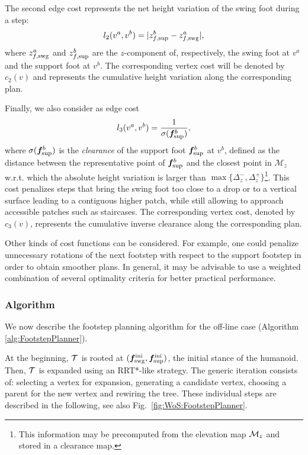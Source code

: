 The second edge cost represents the net height variation of the swing foot
during a step:
\begin{equation}
l_2(v^a, v^b) = |z^b_{f, {\rm sup}} - z^a_{f, {\rm swg}}|,
\label{eq:WoS:costHeight}
\end{equation}
where $z^a_{f, {\rm swg}}$ and $z^b_{f, {\rm sup}}$ are the $z$-component of,
respectively, the swing foot at $v^a$ and the support foot at $v^b$.
The corresponding vertex cost will be denoted by $c_2(v)$ and represents the
cumulative height variation along the corresponding plan. 
    
Finally, we  also consider as edge cost
\begin{equation}
l_3(v^a, v^b) = \frac{1}{\sigma ({\bm{f}}^b_{\rm sup})},
\label{eq:WoS:costClearance}
\end{equation}
where $\sigma ({\bm{f}}^b_{\rm sup})$ is the {\em clearance} of the support foot
${\bm{f}}^b_{\rm sup}$ at $v^b$, defined as the distance between the representative
point of ${\bm{f}}^b_{\rm sup}$ and the closest point in $\mathcal{M}_z$
w.r.t. which the absolute height variation is larger than
$\max\{\Delta_z^-, \Delta_z^+\}$\footnote{This information may be precomputed
from the elevation map ${\cal M}_z$ and stored in a clearance map.}.
This cost penalizes steps that bring the swing foot too close to a drop or to
a vertical surface leading to a contiguous higher patch,
while still allowing to approach accessible patches such as staircases.
The corresponding vertex cost, denoted by $c_3(v)$, represents the cumulative
inverse clearance along the corresponding plan.

Other kinds of cost functions can be considered. For example, one could penalize
unnecessary rotations of the next footstep with respect to the support footstep
in order to obtain smoother plans.  
In general, it may be advisable to use a weighted combination of several
optimality criteria for better practical performance. 

\medskip

\subsubsection{Algorithm}
\label{sec:WoS:offlineCase:FP:PlannerOverview}

We now describe the footstep planning algorithm for the off-line case
(Algorithm \ref{alg:FootstepPlanner}).

At the beginning, $\cal T$ is rooted at
$({\bm{f}}_{\rm swg}^{\rm ini}, {\bm{f}}_{\rm sup}^{\rm ini})$, the initial stance of
the humanoid.
Then, $\cal T$ is expanded using an RRT*-like strategy. The generic iteration
consists of: selecting a vertex for expansion, generating a candidate vertex,
choosing a parent for the new vertex and rewiring the tree. These individual
steps are described in the following, see also Fig.~\ref{fig:WoS:FootstepPlanner}.

